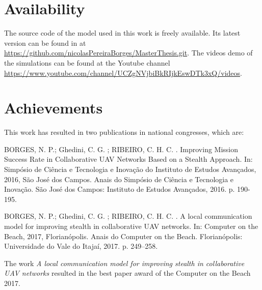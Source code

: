 \section{Availability}
	
The source code of the model used in this work is freely available. Its latest version  can be found in at \url{https://github.com/nicolasPereiraBorges/MasterThesis.git}. The videos demo of the simulations can be found at the Youtube channel \url{https://www.youtube.com/channel/UCZgNVjbiBkRIjkEswDTk3xQ/videos}. 

\section{Achievements}

This work has resulted in two publications in national congresses, which are:

BORGES, N. P.; Ghedini, C. G. ; RIBEIRO, C. H. C. . Improving Mission Success Rate in Collaborative UAV Networks Based on a Stealth Approach. In: Simp\'{o}sio de Ci\^{e}ncia e Tecnologia e Inova\c{c}\~{a}o do Instituto de Estudos Avan\c{c}ados, 2016, S\~{a}o Jos\'{e} dos Campos. Anais do Simp\'{o}sio de Ci\^{e}ncia e Tecnologia e Inova\c{c}\~{a}o. S\~{a}o Jos\'{e} dos Campos: Instituto de Estudos Avan\c{c}ados, 2016. p. 190-195.

BORGES, N. P.; Ghedini, C. G. ; RIBEIRO, C. H. C. . A local communication model for improving stealth in collaborative UAV networks. In: Computer on the Beach, 2017, Florian\'{o}polis. Anais do Computer on the Beach. Florian\'{o}polis: Universidade do Vale do Itaja\'{i}, 2017. p. 249--258.

The work \emph{A local communication model for improving stealth in collaborative UAV networks} resulted in the best paper award of the Computer on the Beach 2017.